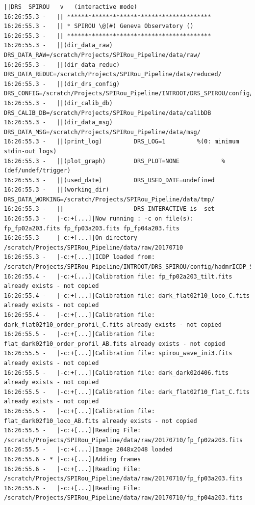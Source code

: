 \begin{lstlisting}[style=text]
||DRS  SPIROU   v   (interactive mode)
16:26:55.3 -   || *****************************************
16:26:55.3 -   || * SPIROU \@(#) Geneva Observatory ()
16:26:55.3 -   || *****************************************
16:26:55.3 -   ||(dir_data_raw)      DRS_DATA_RAW=/scratch/Projects/SPIRou_Pipeline/data/raw/
16:26:55.3 -   ||(dir_data_reduc)    DRS_DATA_REDUC=/scratch/Projects/SPIRou_Pipeline/data/reduced/
16:26:55.3 -   ||(dir_drs_config)    DRS_CONFIG=/scratch/Projects/SPIRou_Pipeline/INTROOT/DRS_SPIROU/config/
16:26:55.3 -   ||(dir_calib_db)      DRS_CALIB_DB=/scratch/Projects/SPIRou_Pipeline/data/calibDB
16:26:55.3 -   ||(dir_data_msg)      DRS_DATA_MSG=/scratch/Projects/SPIRou_Pipeline/data/msg/
16:26:55.3 -   ||(print_log)         DRS_LOG=1         %(0: minimum stdin-out logs)
16:26:55.3 -   ||(plot_graph)        DRS_PLOT=NONE            %(def/undef/trigger)
16:26:55.3 -   ||(used_date)         DRS_USED_DATE=undefined
16:26:55.3 -   ||(working_dir)       DRS_DATA_WORKING=/scratch/Projects/SPIRou_Pipeline/data/tmp/
16:26:55.3 -   ||                    DRS_INTERACTIVE is  set
16:26:55.3 -   |-c:+[...]|Now running : -c on file(s):  fp_fp02a203.fits fp_fp03a203.fits fp_fp04a203.fits
16:26:55.3 -   |-c:+[...]|On directory /scratch/Projects/SPIRou_Pipeline/data/raw/20170710
16:26:55.3 -   |-c:+[...]|ICDP loaded from: /scratch/Projects/SPIRou_Pipeline/INTROOT/DRS_SPIROU/config/hadmrICDP_SPIROU.py
16:26:55.4 -   |-c:+[...]|Calibration file: fp_fp02a203_tilt.fits already exists - not copied
16:26:55.4 -   |-c:+[...]|Calibration file: dark_flat02f10_loco_C.fits already exists - not copied
16:26:55.4 -   |-c:+[...]|Calibration file: dark_flat02f10_order_profil_C.fits already exists - not copied
16:26:55.5 -   |-c:+[...]|Calibration file: flat_dark02f10_order_profil_AB.fits already exists - not copied
16:26:55.5 -   |-c:+[...]|Calibration file: spirou_wave_ini3.fits already exists - not copied
16:26:55.5 -   |-c:+[...]|Calibration file: dark_dark02d406.fits already exists - not copied
16:26:55.5 -   |-c:+[...]|Calibration file: dark_flat02f10_flat_C.fits already exists - not copied
16:26:55.5 -   |-c:+[...]|Calibration file: flat_dark02f10_loco_AB.fits already exists - not copied
16:26:55.5 -   |-c:+[...]|Reading File: /scratch/Projects/SPIRou_Pipeline/data/raw/20170710/fp_fp02a203.fits
16:26:55.5 -   |-c:+[...]|Image 2048x2048 loaded
16:26:55.6 - * |-c:+[...]|Adding frames
16:26:55.6 -   |-c:+[...]|Reading File: /scratch/Projects/SPIRou_Pipeline/data/raw/20170710/fp_fp03a203.fits
16:26:55.6 -   |-c:+[...]|Reading File: /scratch/Projects/SPIRou_Pipeline/data/raw/20170710/fp_fp04a203.fits

\end{lstlisting}

